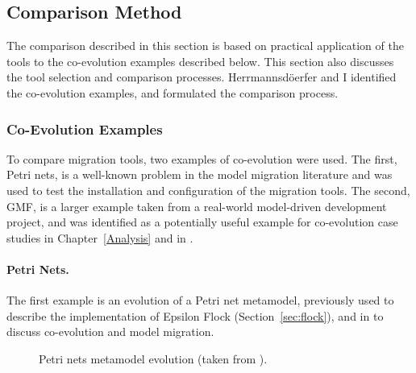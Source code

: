 \subsection{Comparison Method}
\label{sec:method}

\newcommand{\mm}[1]{\texttt{#1}}
The comparison described in this section is based on practical application of the tools to the co-evolution examples described below. This section also discusses the tool selection and comparison processes. Herrmannsd\"{o}erfer and I identified the co-evolution examples, and formulated the comparison process.

\subsubsection{Co-Evolution Examples}
\label{subsec:method_examples}
To compare migration tools, two examples of co-evolution were used. The first, Petri nets, is a well-known problem in the model migration literature and was used to test the installation and configuration of the migration tools. The second, GMF, is a larger example taken from a real-world model-driven development project, and was identified as a potentially useful example for co-evolution case studies in Chapter~\ref{Analysis} and in \cite{herrmannsdoerfer09gmf}.

\paragraph{Petri Nets.}
The first example is an evolution of a Petri net metamodel, previously used to describe the implementation of Epsilon Flock (Section~\ref{sec:flock}), and in \cite{cicchetti08automating,garces09managing,wachsmuth07metamodel} to discuss co-evolution and model migration.

\begin{figure}[htbp]
	\centering
	\caption[Exemplar metamodel evolution (Petri nets)]{Petri nets metamodel evolution (taken from \cite{rose10flock}).}
\label{fig:petri_nets_mms_repeated}
\end{figure}

